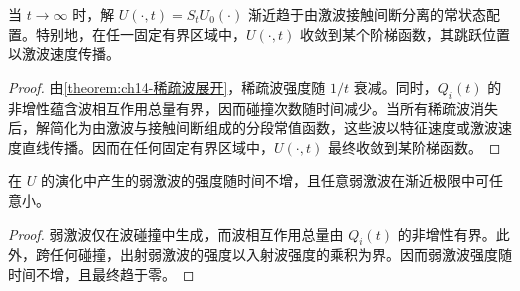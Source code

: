 \documentclass[../../main.tex]{subfiles}
\begin{document}
\begin{theorem}\label{theorem:ch14-解的渐近结构}
当 $t\to\infty$ 时，解 $U(\cdot,t)=S_tU_0(\cdot)$ 渐近趋于由激波接触间断分离的常状态配置。特别地，在任一固定有界区域中，$U(\cdot,t)$ 收敛到某个阶梯函数，其跳跃位置以激波速度传播。
\end{theorem}

\begin{proof}
由\cref{theorem:ch14-稀疏波展开}，稀疏波强度随 $1/t$ 衰减。同时，$Q_i(t)$ 的非增性蕴含波相互作用总量有界，因而碰撞次数随时间减少。当所有稀疏波消失后，解简化为由激波与接触间断组成的分段常值函数，这些波以特征速度或激波速度直线传播。因而在任何固定有界区域中，$U(\cdot,t)$ 最终收敛到某阶梯函数。
\end{proof}

\begin{theorem}\label{theorem:ch14-弱激波稳定性}
在 $U$ 的演化中产生的弱激波的强度随时间不增，且任意弱激波在渐近极限中可任意小。
\end{theorem}

\begin{proof}
弱激波仅在波碰撞中生成，而波相互作用总量由 $Q_i(t)$ 的非增性有界。此外，跨任何碰撞，出射弱激波的强度以入射波强度的乘积为界。因而弱激波强度随时间不增，且最终趋于零。
\end{proof}
\end{document}
